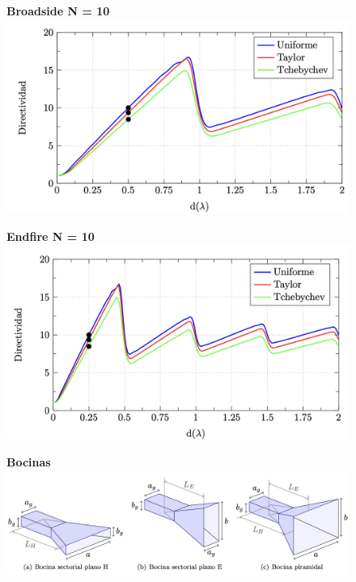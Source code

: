 \documentclass[twocolumn, 8pt]{extarticle}
\begin{document}
\begin{multicols}{2}
	\begin{figure}[H]
		\centering
		\textbf{Broadside N = 10}
		\includegraphics[width=\columnwidth]{directividad_broadside.png}
	\end{figure}

	\begin{figure}[H]
		\centering
		\textbf{Endfire N = 10}
		\includegraphics[width=\columnwidth]{directividad_endfire.png}
	\end{figure}
\end{multicols}

\begin{figure}[H]
	\centering
	\textbf{Bocinas}
	\centering
	\includegraphics[width=\columnwidth]{bocinas.png}
\end{figure}
\end{document}
